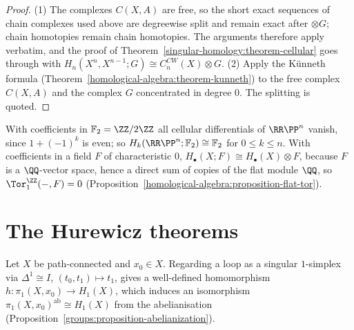 \begin{proof}
(1) The complexes $C(X, A)$ are free, so the short exact sequences of chain complexes used above are degreewise split and remain exact after $\otimes G$; chain homotopies
remain chain homotopies. The arguments therefore apply verbatim, and the proof of Theorem~\ref{singular-homology:theorem-cellular} goes through with
$H_n(X^n, X^{n-1}; G) \cong C^{CW}_n(X) \otimes G$. (2) Apply the K\"unneth formula (Theorem~\ref{homological-algebra:theorem-kunneth}) to the free complex $C(X, A)$ and
the complex $G$ concentrated in degree $0$. The splitting is quoted.
\end{proof}

\begin{example}\label{singular-homology:example-rp-mod-2}
With coefficients in $\mathbb{F}_2 = \ZZ/2\ZZ$ all cellular differentials of $\RR\PP^n$ vanish, since $1 + (-1)^k$ is even; so $H_k(\RR\PP^n; \mathbb{F}_2) \cong \mathbb{F}_2$ for
$0 \leq k \leq n$. With coefficients in a field $F$ of characteristic $0$, $H_\bullet(X; F) \cong H_\bullet(X) \otimes F$, because $F$ is a $\QQ$-vector space, hence a direct sum of copies of the flat module $\QQ$, so $\Tor_1^\ZZ(-, F) = 0$
(Proposition~\ref{homological-algebra:proposition-flat-tor}).
\end{example}

\section{The Hurewicz theorems}\label{singular-homology:section-hurewicz}

\begin{theorem}\label{singular-homology:theorem-hurewicz}
Let $X$ be path-connected and $x_0 \in X$. Regarding a loop as a singular $1$-simplex via $\Delta^1 \cong I$, $(t_0, t_1) \mapsto t_1$, gives a well-defined homomorphism
$h \colon \pi_1(X, x_0) \to H_1(X)$, which induces an isomorphism $\pi_1(X, x_0)^{\mathrm{ab}} \cong H_1(X)$ from the abelianisation
(Proposition~\ref{groups:proposition-abelianization}).
\end{theorem}

